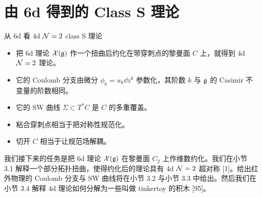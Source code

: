 \section{由 6d 得到的 Class S 理论}

\begin{keybox}{从 6d 看 4d $\mathcal{N}=2$ class S 理论}
\begin{itemize}[leftmargin=1.4em,itemsep=1pt,topsep=1pt]
\item 把 6d 理论 $\mathcal{X}(\mathfrak{g})$ 作一个扭曲后约化在带穿刺点的黎曼面 $C$ 上，就得到 4d $\mathcal{N}=2$ 理论。
\item 它的 Coulomb 分支由微分 $\phi_k=u_k\dd z^k$ 参数化，其阶数 $k$ 与 $\mathfrak{g}$ 的 Casimir 不变量的阶数相同。
\item 它的 SW 曲线 $\Sigma\subset T^*C$ 是 $C$ 的多重覆盖。
\item 粘合穿刺点相当于把对称性规范化。
\item 切开 $C$ 相当于让规范场解耦。
\end{itemize}
\end{keybox}

我们接下来的任务是把 6d 理论 $\mathcal{X}(\mathfrak{g})$ 在黎曼面 $C_2$ 上作维数约化。我们在小节 3.1 解释一个部分拓扑扭曲，使得约化后的理论具有 4d $\mathcal{N}=2$ 超对称 [1]。给出红外物理的 Coulomb 分支与 SW 曲线将在小节 3.2 与小节 3.3 中给出。然后我们在小节 3.4 解释 4d 理论如何分解为一些叫做 tinkertoy 的积木 [95]。


